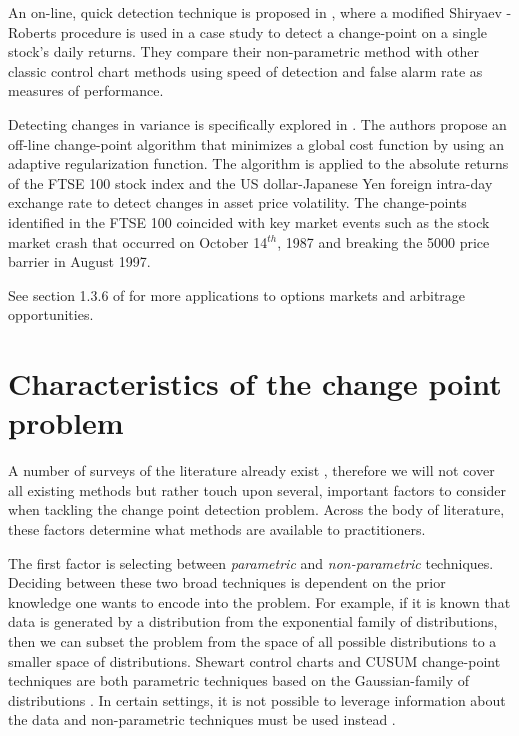 An on-line, quick detection technique is proposed in  \cite{pepelyshev2015real}, where a modified Shiryaev - Roberts procedure is used in a case study to detect a change-point on a single stock's daily returns. They compare their non-parametric method with other classic control chart methods using speed of detection and false alarm rate as measures of performance.

Detecting changes in variance is specifically explored in  \cite{lavielle2007adaptive}. The authors propose an off-line change-point algorithm that minimizes a global cost function by using an adaptive regularization function. The algorithm is applied to the absolute returns of the FTSE 100 stock index and the US dollar-Japanese Yen foreign intra-day exchange rate to detect changes in asset price volatility. The change-points  identified in the FTSE 100 coincided with key market events such as the stock market crash that occurred on October 14$^{th}$, 1987 and breaking the 5000 price barrier in August 1997.

See section 1.3.6 of \cite{tartakovsky2014sequential} for more applications to options markets and arbitrage opportunities.

\section{Characteristics of the change point problem}
A number of surveys of the literature already exist \cite{aminikhanghahi2017survey} \cite{niu2016multiple}, therefore we will not cover all existing methods but rather touch upon several, important factors to consider when tackling the change point detection problem. Across the body of literature, these factors determine what methods are available to practitioners. %

The first factor is selecting between \textit{parametric} and \textit{non-parametric} techniques. Deciding between these two broad techniques is dependent on the prior knowledge one wants to encode into the problem. For example, if it is known that data is generated by a distribution from the exponential family of distributions, then we can subset the problem from the space of all possible distributions to a smaller space of distributions. Shewart control charts and CUSUM change-point techniques are both parametric techniques based on the Gaussian-family of distributions \cite{page1954continuous} \cite{chen2011parametric}. In certain settings, it is not possible to leverage information about the data and non-parametric techniques must be used instead \cite{brodsky2013nonparametric}.

